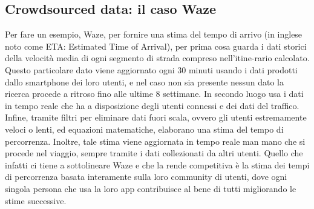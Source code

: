 \subsection{Crowdsourced data: il caso Waze}

Per fare un esempio, Waze, per fornire una stima del tempo di arrivo (in inglese noto come ETA: Estimated Time of Arrival), per prima cosa guarda i dati storici della velocità media di ogni segmento di strada compreso nell'itine-rario calcolato. Questo particolare dato viene aggiornato ogni 30 minuti usando i dati prodotti dallo smartphone dei loro utenti, e nel caso non sia presente nessun dato la ricerca procede a ritroso fino alle ultime 8 settimane. In secondo luogo usa i dati in tempo reale che ha a disposizione degli utenti connessi e dei dati del traffico. Infine, tramite filtri per eliminare dati fuori scala, ovvero gli utenti estremamente veloci o lenti, ed equazioni matematiche, elaborano una stima del tempo di percorrenza. Inoltre, tale stima viene aggiornata in tempo reale man mano che si procede nel viaggio, sempre tramite i dati collezionati da altri utenti. Quello che infatti ci tiene a sottolineare Waze e che la rende competitiva è la stima dei tempi di percorrenza basata interamente sulla loro community di utenti, dove ogni singola persona che usa la loro app contribuisce al bene di tutti migliorando le stime successive\cite{wazeblog}.






















